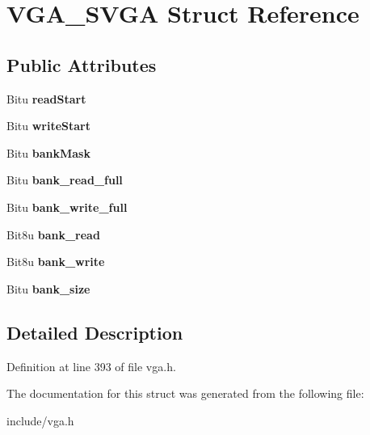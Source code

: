 \hypertarget{structVGA__SVGA}{\section{V\-G\-A\-\_\-\-S\-V\-G\-A Struct Reference}
\label{structVGA__SVGA}
}
\subsection*{Public Attributes}
\begin{DoxyCompactItemize}
\item 
\hypertarget{structVGA__SVGA_a12feba28b67c048513e66e201fac71dc}{Bitu {\bfseries read\-Start}}\label{structVGA__SVGA_a12feba28b67c048513e66e201fac71dc}

\item 
\hypertarget{structVGA__SVGA_a6dd88ed646507e88dec8ea6f36168810}{Bitu {\bfseries write\-Start}}\label{structVGA__SVGA_a6dd88ed646507e88dec8ea6f36168810}

\item 
\hypertarget{structVGA__SVGA_ac754dc12435255d72973c78b3130f611}{Bitu {\bfseries bank\-Mask}}\label{structVGA__SVGA_ac754dc12435255d72973c78b3130f611}

\item 
\hypertarget{structVGA__SVGA_a709b930e64d2c6a7f97f2a707a8c6baa}{Bitu {\bfseries bank\-\_\-read\-\_\-full}}\label{structVGA__SVGA_a709b930e64d2c6a7f97f2a707a8c6baa}

\item 
\hypertarget{structVGA__SVGA_ab222686ed91393c5f22fcbc2683a9afb}{Bitu {\bfseries bank\-\_\-write\-\_\-full}}\label{structVGA__SVGA_ab222686ed91393c5f22fcbc2683a9afb}

\item 
\hypertarget{structVGA__SVGA_a97458414e7c3e11d66fe7a04442ee044}{Bit8u {\bfseries bank\-\_\-read}}\label{structVGA__SVGA_a97458414e7c3e11d66fe7a04442ee044}

\item 
\hypertarget{structVGA__SVGA_ad9e4750a5b4addc6f5b5bd332cec147f}{Bit8u {\bfseries bank\-\_\-write}}\label{structVGA__SVGA_ad9e4750a5b4addc6f5b5bd332cec147f}

\item 
\hypertarget{structVGA__SVGA_a3182c5e72fb68b0c125e9f350de5a2e3}{Bitu {\bfseries bank\-\_\-size}}\label{structVGA__SVGA_a3182c5e72fb68b0c125e9f350de5a2e3}

\end{DoxyCompactItemize}


\subsection{Detailed Description}


Definition at line 393 of file vga.\-h.



The documentation for this struct was generated from the following file\-:\begin{DoxyCompactItemize}
\item 
include/vga.\-h\end{DoxyCompactItemize}
